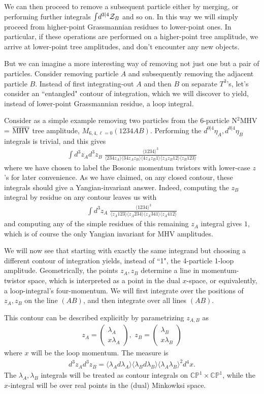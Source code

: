 \documentclass[11pt, reqno]{article}
\newcommand{\be}{\begin{eqnarray}}
\newcommand{\ee}{\end{eqnarray}}
\begin{document}
We can then proceed to remove a subsequent particle either by merging, or performing further integrals $\int\!d^{3|4}{\cal Z}_B$ and so on. In this way we will simply proceed from higher-point Grassmannian residues to lower-point ones. In particular, if these operations are performed on a higher-point tree amplitude, we arrive at lower-point tree amplitudes, and don't encounter any new objects.

But we can imagine a more interesting way of removing not just one but a pair of particles.
Consider removing particle $A$ and subsequently removing the adjacent particle $B$. Instead of first integrating-out $A$ and then $B$ on separate $T^3$'s,
let's consider an ``entangled" contour of integration, which we will discover to yield, instead of lower-point Grassmannian residue, a loop integral.

Consider as a simple example removing two particles from the 6-particle
N$^2$MHV = $\overline{{\rm MHV}}$ tree amplitude, $M_{6,4,\ell=0}(1234AB)$. Performing the $d^{0|4}\eta_A,d^{0|4}\eta_B$ integrals is
trivial, and this gives \be \int\!\!d^3 z_A d^3 z_B\;\frac{\langle 1234
\rangle^3}{\langle 2 3 4 z_A \rangle \langle 34 z_A z_B \rangle \langle 4 z_A z_B 1
\rangle \langle z_A z_B 12 \rangle \langle z_B123 \rangle} \ee where we have chosen to label the Bosonic momentum twistors with lower-case $z$'s
for later convenience.
As we have
claimed, on any closed contour, these integrals should give a
Yangian-invariant answer. Indeed, computing the $z_B$ integral by residue on any contour
 leaves us with \be \int\!\! d^3 z_A \;\frac{\langle 1 2 3 4
\rangle^3}{\langle z_A 123 \rangle \langle z_A 234 \rangle \langle z_A 341
\rangle \langle z_A 412 \rangle} \ee and computing any of the simple residues of this
remaining $z_A$ integral gives $1$, which is of course the only Yangian invariant for MHV
amplitudes.

We will now see that starting with exactly the same integrand but
choosing a different contour of integration yields, instead of ``1",
the 4-particle 1-loop amplitude. Geometrically, the points $z_A,z_B$
determine a line in momentum-twistor space, which is interpreted as a point in the dual $x$-space,
or equivalently, a loop-integral's four-momentum. We will first integrate
over the positions of $z_A,z_B$ on the line $(AB)$, and then integrate
over all lines $(AB)$.

This contour can be described explicitly by parametrizing $z_{A,B}$ as
\be z_A = \left( \begin{array}{c} \lambda_A \\ x  \lambda_A
\end{array} \right), \, \, z_B = \left( \begin{array}{c} \lambda_B \\ x
\lambda_B
\end{array} \right) \ee
where $x$ will be the loop momentum.  The measure is \be d^3 z_A d^3 z_B = \langle \lambda_A
d \lambda_A \rangle \langle \lambda_B d \lambda_B \rangle \langle
\lambda_A \lambda_B \rangle^2 d^4 x.
\ee
The $\lambda_A,\lambda_B$ integrals will be treated as contour integrals on $\mathbb{CP}^1 \times \mathbb{CP}^1$, while the $x$-integral will be over real points
in the (dual) Minkowksi space.
\end{document}

